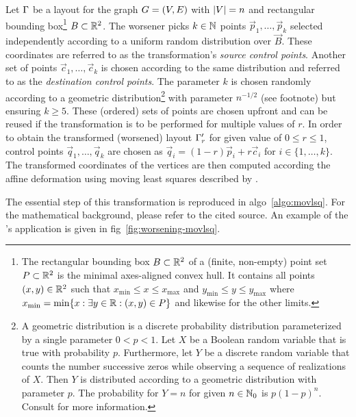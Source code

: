 \documentclass{graphstudy}
\begin{document}
Let \(\Gamma\) be a layout for the graph \(G=(V,E)\) with \(\left\lvert V\right\rvert=n\) and rectangular bounding
box\footnote{%
  The rectangular bounding box \(\Vec{B}\subset\Reals^2\) of a (finite, non-empty) point set \(\Vec{P}\subset\Reals^2\)
  is the minimal axes-aligned convex hull.  It contains all points \((x,y)\in\Reals^2\) such that
  \(x_\mathrm{min}\leq{}x\leq{}x_\mathrm{max}\) and \(y_\mathrm{min}\leq{}y\leq{}y_\mathrm{max}\) where
  \(x_\mathrm{min}=\min\{x\suchthat\exists{}y\in\Reals\suchthat(x,y)\in\Vec{P}\}\) and likewise for the other limits.
}
\(\Vec{B}\subset\Reals^2\).  The  worsener picks \(k\in\mathbb{N}\) points \(\vec{p}_1,\ldots,\vec{p}_k\)
selected independently according to a uniform random distribution over \(\Vec{B}\).  These coordinates are referred to
as the transformation's \emph{source control points}.  Another set of points \(\vec{c}_1,\ldots,\vec{c}_k\) is chosen
according to the same distribution and referred to as the \emph{destination control points}.  The parameter \(k\) is
chosen randomly according to a geometric distribution\footnote{%
  A geometric distribution is a discrete probability distribution parameterized by a single parameter \(0<p<1\).  Let
  \(X\) be a Boolean random variable that is true with probability \(p\).  Furthermore, let \(Y\) be a discrete random
  variable that counts the number successive zeros while observing a sequence of realizations of \(X\).  Then \(Y\) is
  distributed according to a geometric distribution with parameter \(p\).  The probability for \(Y=n\) for given
  \(n\in\mathbb{N}_0\) is \(p(1-p)^n\).  Consult \textcite{MathWorldGeoDist} for more information.
}
with parameter \(n^{-1/2}\) (see footnote) but ensuring \(k\geq5\).  These (ordered) sets of points are chosen upfront
and can be reused if the transformation is to be performed for multiple values of \(r\).  In order to obtain the
transformed (worsened) layout \(\Gamma_r'\) for given value of \(0\leq{r}\leq1\), control points
\(\vec{q}_1,\ldots,\vec{q}_k\) are chosen as \(\vec{q}_i=(1-r)\vec{p}_i+r\vec{c}_i\) for \(i\in\{1,\ldots,k\}\).  The
transformed coordinates of the vertices are then computed according the affine deformation using moving least squares
described by \textcite[\acs{section}~2.1]{Schaefer2006}.

The essential step of this transformation is reproduced in \acl{algo}~\ref{algo:movlsq}.  For the mathematical
background, please refer to the cited source.  An example of the 's application is given in
\acl{fig}~\ref{fig:worsening-movlsq}.
\end{document}
